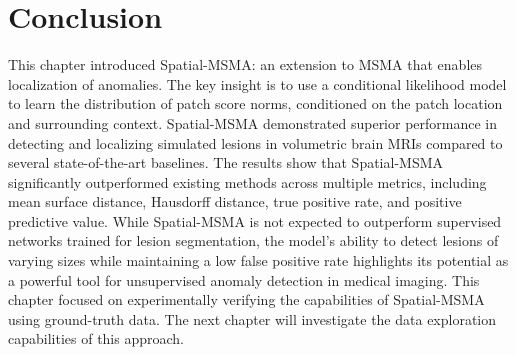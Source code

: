 \section{Conclusion}
This chapter introduced Spatial-MSMA: an extension to MSMA that enables localization of anomalies. The key insight is to use a conditional likelihood model to learn the distribution of patch score norms, conditioned on the patch location and surrounding context.  Spatial-MSMA demonstrated superior performance in detecting and localizing simulated lesions in volumetric brain MRIs compared to several state-of-the-art baselines. The results show that Spatial-MSMA significantly outperformed existing methods across multiple metrics, including mean surface distance, Hausdorff distance, true positive rate, and positive predictive value. While Spatial-MSMA is not expected to outperform supervised networks trained for lesion segmentation, the model's ability to detect lesions of varying sizes while maintaining a low false positive rate highlights its potential as a powerful tool for unsupervised anomaly detection in medical imaging. This chapter focused on experimentally verifying the capabilities of Spatial-MSMA using ground-truth data. The next chapter will investigate the data exploration capabilities of this approach.